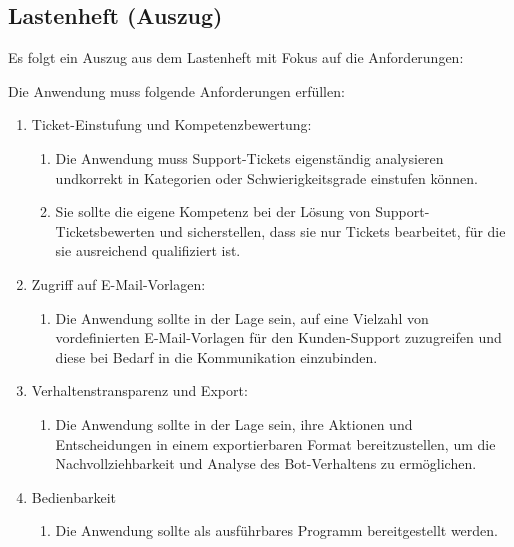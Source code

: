 \subsection{Lastenheft (Auszug)}
\label{app:Lastenheft}
Es folgt ein Auszug aus dem Lastenheft mit Fokus auf die Anforderungen:

Die Anwendung muss folgende Anforderungen erfüllen: 
\begin{enumerate}[itemsep=0em,partopsep=0em,parsep=0em,topsep=0em]
\item Ticket-Einstufung und Kompetenzbewertung:
	\begin{enumerate}
	\item Die Anwendung muss Support-Tickets eigenständig analysieren undkorrekt in Kategorien oder Schwierigkeitsgrade einstufen können.
	\item Sie sollte die eigene Kompetenz bei der Lösung von Support-Ticketsbewerten und sicherstellen, dass sie nur Tickets bearbeitet, für die sie ausreichend qualifiziert ist.
	\end{enumerate}
\item Zugriff auf E-Mail-Vorlagen:
	\begin{enumerate}
	\item Die Anwendung sollte in der Lage sein, auf eine Vielzahl von vordefinierten E-Mail-Vorlagen für den Kunden-Support zuzugreifen und diese bei Bedarf in die Kommunikation einzubinden.
	\end{enumerate}
\item Verhaltenstransparenz und Export:
	\begin{enumerate}
	\item Die Anwendung sollte in der Lage sein, ihre Aktionen und Entscheidungen in einem exportierbaren Format bereitzustellen, um die Nachvollziehbarkeit und Analyse des Bot-Verhaltens zu ermöglichen.
	\end{enumerate}
\item Bedienbarkeit
	\begin{enumerate}
	\item Die Anwendung sollte als ausführbares Programm bereitgestellt werden.
	\end{enumerate}
\end{enumerate}

